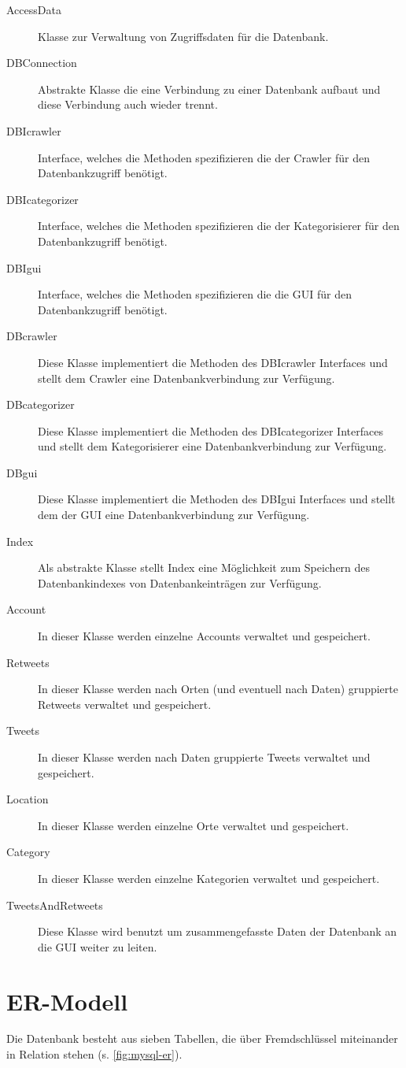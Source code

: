 \begin{description}
	\item[AccessData] Klasse zur Verwaltung von Zugriffsdaten für die Datenbank.
	\item[DBConnection] Abstrakte Klasse die eine Verbindung zu einer Datenbank aufbaut und diese Verbindung auch wieder trennt.
	\item[DBIcrawler] Interface, welches die Methoden spezifizieren die der Crawler für den Datenbankzugriff benötigt.
	\item[DBIcategorizer] Interface, welches die Methoden spezifizieren die der Kategorisierer für den Datenbankzugriff benötigt.
	\item[DBIgui] Interface, welches die Methoden spezifizieren die die GUI für den Datenbankzugriff benötigt.
	\item[DBcrawler] Diese Klasse implementiert die Methoden des DBIcrawler Interfaces und stellt dem Crawler eine Datenbankverbindung zur Verfügung.
	\item[DBcategorizer] Diese Klasse implementiert die Methoden des DBIcategorizer Interfaces und stellt dem Kategorisierer eine Datenbankverbindung zur Verfügung.
	\item[DBgui] Diese Klasse implementiert die Methoden des DBIgui Interfaces und stellt dem der GUI eine Datenbankverbindung zur Verfügung.
	\item[Index] Als abstrakte Klasse stellt Index eine Möglichkeit zum Speichern des Datenbankindexes von Datenbankeinträgen zur Verfügung.
	\item[Account] In dieser Klasse werden einzelne Accounts verwaltet und gespeichert.
	\item[Retweets] In dieser Klasse werden nach Orten (und eventuell nach Daten) gruppierte Retweets verwaltet und gespeichert.
	\item[Tweets] In dieser Klasse werden nach Daten gruppierte Tweets verwaltet und gespeichert.
	\item[Location] In dieser Klasse werden einzelne Orte verwaltet und gespeichert.
	\item[Category] In dieser Klasse werden einzelne Kategorien verwaltet und gespeichert.
	\item[TweetsAndRetweets] Diese Klasse wird benutzt um zusammengefasste Daten der Datenbank an die GUI weiter zu leiten.
\end{description}

\section{ER-Modell}
Die Datenbank besteht aus sieben Tabellen, die über Fremdschlüssel miteinander in Relation stehen (s. \cref{fig:mysql-er}).\\


